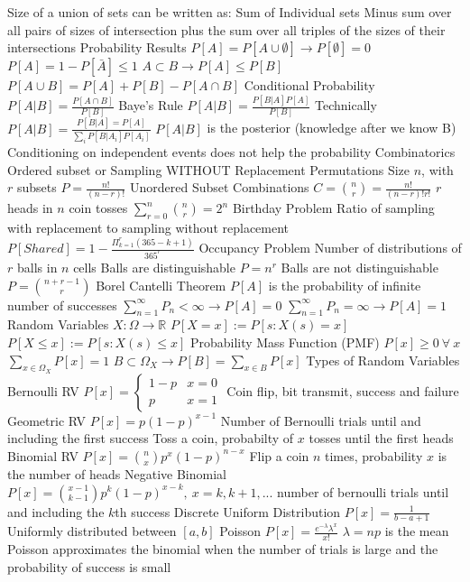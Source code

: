 \documentclass[14pt]{extarticle}
\begin{document}
\begin{outline}
				\3	Size of a union of sets can be written as:
					\4	Sum of Individual sets
					\4	Minus sum over all pairs of sizes of intersection
					\4	plus the sum over all triples of the sizes of their intersections
			\2	Probability Results
				\3	$P[A] = P[A \cup \emptyset] \rightarrow P[\emptyset] = 0$
				\3	$P[A] = 1 - P[\bar{A}] \le 1$
				\3	$A \subset B \rightarrow P[A] \le P[B]$
				\3	$P[A \cup B] = P[A] + P[B] - P[A \cap B]$
		\1	Conditional Probability
			\2	$P[A | B] = \frac{P[A \cap B]}{P[B]}$
		\1	Baye's Rule
			\2	$P[A | B] = \frac{P[B|A] P[A]}{P[B]}$
				\3	Technically $P[A | B] = \frac{P[B | A] = P[A]}{\sum_i P[B|A_i]P[A_i]}$
			\2	$P[A |B]$ is the posterior (knowledge after we know B)
			\2	Conditioning on independent events does not help the probability
		\1	Combinatorics
			\2	Ordered subset or Sampling WITHOUT Replacement
				\3	Permutations	
				\3	Size $n$, with $r$ subsets
				\3	$P = \frac{n!}{(n - r)!}$
			\2	Unordered Subset 
				\3	Combinations
				\3	$C = \binom{n}{r} = \frac{n!}{(n-r)!r!}$
				\3	$r$ heads in $n$ coin tosses
				\3	$\sum_{r = 0}^n \binom{n}{r} = 2^n$
			\2	Birthday Problem
				\3	Ratio of sampling with replacement to sampling without replacement
				\3	$P[Shared] = 1 - \frac{\Pi_{k = 1}^r (365 - k + 1)}{365^r}$
			\2	Occupancy Problem
				\3	Number of distributions of $r$ balls in $n$ cells
				\3	Balls are distinguishable
					\4	$P = n^r$
				\3	Balls are not distinguishable
					\4	$P = \binom{n+r-1}{r}$
		\1	Borel Cantelli Theorem
			\2	$P[A]$ is the probability of infinite number of successes
			\2	$\sum_{n=1}^{\infty} P_n < \infty \rightarrow P[A] = 0$
			\2	$\sum_{n=1}^{\infty} P_n = \infty \rightarrow P[A] = 1$
		\1	Random Variables
			\2	$X : \Omega \rightarrow \mathbb{R}$
			\2	$P[X = x] := P[s : X(s) = x]$
			\2	$P[X \le x] := P[s : X(s) \le x]$
			\2	Probability Mass Function (PMF)
				\3	$P[x] \ge 0~\forall~x$
				\3	$\sum_{x \in \Omega_X}P[x] = 1$
				\3	$B \subset \Omega_X \rightarrow P[B] = \sum_{x \in B}P[x]$
		\1	Types of Random Variables
			\2	Bernoulli RV
				\3	$P[x] = \begin{cases} 1 - p & x = 0 \\ p & x = 1   \end{cases}$
				\3	Coin flip, bit transmit, success and failure
			\2	Geometric RV
				\3	$P[x] = p(1-p)^{x-1}$
				\3	Number of Bernoulli trials until and including the first success
				\3	Toss a coin, probabilty of $x$ tosses until the first heads
			\2	Binomial RV
				\3	$P[x] = \binom{n}{x}p^x(1-p)^{n-x}$
				\3	Flip a coin $n$ times, probability $x$ is the number of heads
			\2	Negative Binomial
				\3	$P[x] = \binom{x-1}{k-1}p^k(1-p)^{x-k},~x=k,k+1,...$
				\3	number of bernoulli trials until and including the $k$th success
			\2	Discrete Uniform Distribution
				\3	$P[x] = \frac{1}{b - a + 1}$
				\3	Uniformly distributed between $[a,b]$
			\2	Poisson
				\3	$P[x] = \frac{e^{-\lambda}\lambda^x}{x!}$
				\3	$\lambda = np$ is the mean
				\3	Poisson approximates the binomial when the number of trials is large
						and the probability of success is small

	\end{outline}
\end{document}

